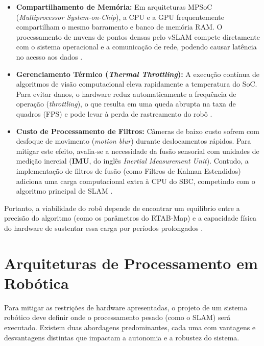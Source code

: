 \begin{itemize}
    \item \textbf{Compartilhamento de Memória:} Em arquiteturas MPSoC (\textit{Multiprocessor System-on-Chip}), a CPU e a GPU frequentemente compartilham o mesmo barramento e banco de memória RAM. O processamento de nuvens de pontos densas pelo vSLAM compete diretamente com o sistema operacional e a comunicação de rede, podendo causar latência no acesso aos dados \cite{costa2019characterizingpolybenchgpu}.
    
    \item \textbf{Gerenciamento Térmico (\textit{Thermal Throttling}):} A execução contínua de algoritmos de visão computacional eleva rapidamente a temperatura do SoC. Para evitar danos, o hardware reduz automaticamente a frequência de operação (\textit{throttling}), o que resulta em uma queda abrupta na taxa de quadros (FPS) e pode levar à perda de rastreamento do robô \cite{costa2019characterizingpolybenchgpu, canovas2021onboarddynamicrgbd}.
    
     \item \textbf{Custo de Processamento de Filtros:} Câmeras de baixo custo sofrem com desfoque de movimento (\textit{motion blur}) durante deslocamentos rápidos. Para mitigar este efeito, avalia-se a necessidade da fusão sensorial com unidades de medição inercial (\textbf{IMU}, do inglês \emph{Inertial Measurement Unit}). Contudo, a implementação de filtros de fusão (como Filtros de Kalman Estendidos) adiciona uma carga computacional extra à CPU do SBC, competindo com o algoritmo principal de SLAM \cite{qayyum2017imuaidedrgbd}.
\end{itemize}

Portanto, a viabilidade do robô depende de encontrar um equilíbrio entre a precisão do algoritmo (como os parâmetros do RTAB-Map) e a capacidade física do hardware de sustentar essa carga por períodos prolongados \cite{nagarajan2024multiobjectiveoptimizationrtabmap}.

\section{Arquiteturas de Processamento em Robótica}

Para mitigar as restrições de hardware apresentadas, o projeto de um sistema robótico deve definir onde o processamento pesado (como o SLAM) será executado. Existem duas abordagens predominantes, cada uma com vantagens e desvantagens distintas que impactam a autonomia e a robustez do sistema.

